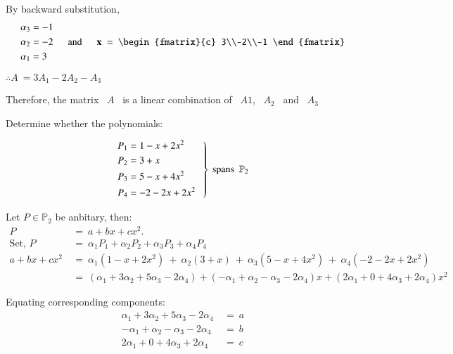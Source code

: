 \documentclass[12pt]{article}
\begin{document}
\vspace{-\baselineskip}
By backward substitution,
$$\begin{aligned}\alpha_3 &= -1\\\alpha_2 &= -2\\\alpha_1 &= 3\end{aligned} \tabs \text{and} \tabs \mathbf{x} \ = \ \begin{fmatrix}{c}
   3\\-2\\-1
\end{fmatrix}$$
\vspace{-\baselineskip}
\begin{center}
$\therefore A \ = 3A_1-2A_2-A_3$

Therefore, the matrix \ $A$ \ is a linear combination of \ $A1$, \ $A_2$ \ and \ $A_3$
\end{center}

\vspace{5ex}
\vspace{1ex}
 Determine whether the polynomials:

\begin{equation*}
   \left.
   \begin{aligned}
   & P_1=1-x+2x^2 \\
   & P_2=3+x \\
   & P_3=5-x+4x^2 \\
   & P_4=-2-2 x+2x^2 
   \end{aligned} \tab \right\} \ \text{spans} \ \ \mathbb{P}_2
\end{equation*}

\vspace{3ex}
 Let $P \in \mathbb{P}_2$ be anbitary, then:
\vspace{-0.75\baselineskip}
\begin{align*}
P \ &= \ a+bx+cx^2 . \\
\text {Set, \ } P \ &= \ \alpha_1 P_1+\alpha_2 P_2+\alpha_3 P_3+\alpha_4 P_4 \\
a+bx+cx^2 \ &= \ \alpha_1(1-x+2x^2) \ + \ \alpha_2(3+x)
\ + \ \alpha_3(5-x+4x^2) \ + \ \alpha_4(-2-2 x+2x^2)\\
\ &= \ (\alpha_1+3 \alpha_2+5 \alpha_3-2 \alpha_4)+(-\alpha_1+\alpha_2-\alpha_3-2 \alpha_4) x+(2 \alpha_1+0+4 \alpha_3+2\alpha_4) x^2
\end{align*}

Equating corresponding components:
\vspace{-0.75\baselineskip}
\begin{align*}
   \alpha_1+3 \alpha_2+5 \alpha_3-2 \alpha_4 \ &= \ a\\
   -\alpha_1+\alpha_2-\alpha_3-2 \alpha_4 \ &= \ b\\
   2\alpha_1+0+4 \alpha_3+2\alpha_4 \ &= \ c
\end{align*}
\end{document}
